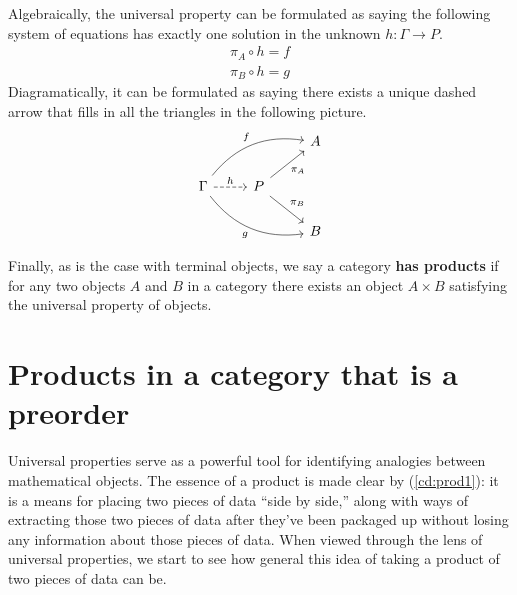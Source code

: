 Algebraically, the universal property can be formulated as saying
  the following system of equations has exactly one solution
  in the unknown \(h : \Gamma \to P\).
  \begin{align}
    \pi_A \circ h = f \\
    \pi_B \circ h = g
  \end{align}
Diagramatically, it can be formulated as saying there exists a unique
dashed arrow that fills in all the triangles in the following picture.
\begin{equation}
\begin{tikzcd}
                                                                                        &                                    & A \\
\Gamma \arrow[rru, "f", bend left] \arrow[r, "h", dashed] \arrow[rrd, "g"', bend right] & P \arrow[ru, "\pi_A"'] \arrow[rd, "\pi_B"] &   \\
                                                                                        &                                    & B
\end{tikzcd}
\end{equation}

Finally, as is the case with terminal objects, we say a category \textbf{has
products} if for any two objects $A$ and $B$ in a category there exists an 
object $A \times B$ satisfying the universal property of objects.

\section{Products in a category that is a preorder}
Universal properties serve as a powerful tool for identifying analogies between
mathematical objects. The essence of a product is made clear by
(\ref{cd:prod1}): it is a means for placing two pieces of data ``side by side,''
along with ways of extracting those two pieces of data after they've been
packaged up without losing any information about those pieces of data.  When
viewed through the lens of universal properties, we start to see how general
this idea of taking a product of two pieces of data can be.

